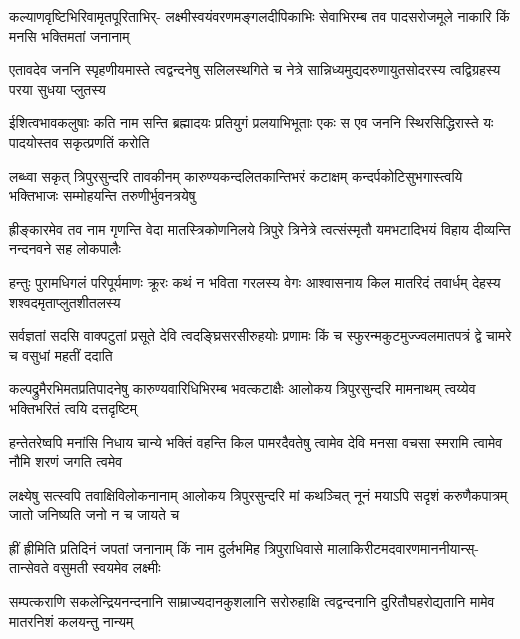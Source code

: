 
\fourlineindentedshloka
{कल्याणवृष्टिभिरिवामृतपूरिताभिर्-}
{लक्ष्मीस्वयंवरणमङ्गलदीपिकाभिः}
{सेवाभिरम्ब तव पादसरोजमूले}
{नाकारि किं मनसि भक्तिमतां जनानाम्}%

\fourlineindentedshloka
{एतावदेव जननि स्पृहणीयमास्ते}
{त्वद्वन्दनेषु सलिलस्थगिते च नेत्रे}
{सान्निध्यमुद्यदरुणायुतसोदरस्य}
{त्वद्विग्रहस्य परया सुधया प्लुतस्य}%

\fourlineindentedshloka
{ईशित्वभावकलुषाः कति नाम सन्ति}
{ब्रह्मादयः प्रतियुगं प्रलयाभिभूताः}
{एकः स एव जननि स्थिरसिद्धिरास्ते}
{यः पादयोस्तव सकृत्प्रणतिं करोति}%

\fourlineindentedshloka
{लब्ध्वा सकृत् त्रिपुरसुन्दरि तावकीनम्}
{कारुण्यकन्दलितकान्तिभरं कटाक्षम्}
{कन्दर्पकोटिसुभगास्त्वयि भक्तिभाजः}
{सम्मोहयन्ति तरुणीर्भुवनत्रयेषु}%

\fourlineindentedshloka
{ह्रीङ्कारमेव तव नाम गृणन्ति वेदा}
{मातस्त्रिकोणनिलये त्रिपुरे त्रिनेत्रे}
{त्वत्संस्मृतौ यमभटादिभयं विहाय}
{दीव्यन्ति नन्दनवने सह लोकपालैः}%

\fourlineindentedshloka
{हन्तुः पुरामधिगलं परिपूर्यमाणः}
{क्रूरः कथं न भविता गरलस्य वेगः}
{आश्वासनाय किल मातरिदं तवार्धम्}
{देहस्य शश्वदमृताप्लुतशीतलस्य}%

\fourlineindentedshloka
{सर्वज्ञतां सदसि वाक्पटुतां प्रसूते}
{देवि त्वदङ्घ्रिसरसीरुहयोः प्रणामः}
{किं च स्फुरन्मकुटमुज्ज्वलमातपत्रं}
{द्वे चामरे च वसुधां महतीं ददाति}%

\fourlineindentedshloka
{कल्पद्रुमैरभिमतप्रतिपादनेषु}
{कारुण्यवारिधिभिरम्ब भवत्कटाक्षैः}
{आलोकय त्रिपुरसुन्दरि मामनाथम्}
{त्वय्येव भक्तिभरितं त्वयि दत्तदृष्टिम्}%

\fourlineindentedshloka
{हन्तेतरेष्वपि मनांसि निधाय चान्ये}
{भक्तिं वहन्ति किल पामरदैवतेषु}
{त्वामेव देवि मनसा वचसा स्मरामि}
{त्वामेव नौमि शरणं जगति त्वमेव}%

\fourlineindentedshloka
{लक्ष्येषु सत्स्वपि तवाक्षिविलोकनानाम्}
{आलोकय त्रिपुरसुन्दरि मां कथञ्चित्}
{नूनं मयाऽपि सदृशं करुणैकपात्रम्}
{जातो जनिष्यति जनो न च जायते च}%

\fourlineindentedshloka
{ह्रीं ह्रीमिति प्रतिदिनं जपतां जनानाम्}
{किं नाम दुर्लभमिह त्रिपुराधिवासे}
{मालाकिरीटमदवारणमाननीयान्स्-}
{तान्सेवते वसुमती स्वयमेव लक्ष्मीः}%

\fourlineindentedshloka
{सम्पत्कराणि सकलेन्द्रियनन्दनानि}
{साम्राज्यदानकुशलानि सरोरुहाक्षि}
{त्वद्वन्दनानि दुरितौघहरोद्यतानि}
{मामेव मातरनिशं कलयन्तु नान्यम्}%

